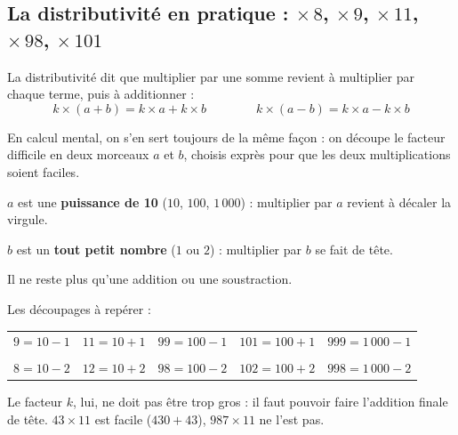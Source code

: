 \subsection{La distributivité en pratique : $\times\,8$, $\times\,9$, $\times\,11$, $\times\,98$, $\times\,101$}

\begin{theorie}
La distributivité dit que multiplier par une somme revient à multiplier par chaque
terme, puis à additionner :
\[ k \times (a + b) = k \times a + k \times b
   \qquad\qquad
   k \times (a - b) = k \times a - k \times b \]

En calcul mental, on s'en sert toujours de la même façon : on découpe le facteur
difficile en deux morceaux $a$ et $b$, choisis exprès pour que les deux
multiplications soient faciles.

\begin{compactitem}
\item $a$ est une \textbf{puissance de 10} ($10$, $100$, $1\,000$) : multiplier par $a$
      revient à décaler la virgule.
\item $b$ est un \textbf{tout petit nombre} ($1$ ou $2$) : multiplier par $b$ se fait
      de tête.
\end{compactitem}

Il ne reste plus qu'une addition ou une soustraction.
\end{theorie}

\begin{astuce}
Les découpages à repérer :

\begin{center}
\renewcommand{\arraystretch}{1.4}
\begin{tabular}{|c|c|c|c|c|}
\hline
\rowcolor{entete}
\multicolumn{5}{|c|}{$b = 1$} \\ \hline
$9 = 10 - 1$ & $11 = 10 + 1$ & $99 = 100 - 1$ & $101 = 100 + 1$ & $999 = 1\,000 - 1$ \\ \hline
\rowcolor{entete}
\multicolumn{5}{|c|}{$b = 2$} \\ \hline
$8 = 10 - 2$ & $12 = 10 + 2$ & $98 = 100 - 2$ & $102 = 100 + 2$ & $998 = 1\,000 - 2$ \\ \hline
\end{tabular}
\end{center}

Le facteur $k$, lui, ne doit pas être trop gros : il faut pouvoir faire l'addition
finale de tête. $43 \times 11$ est facile ($430 + 43$), $987 \times 11$ ne l'est pas.
\end{astuce}

